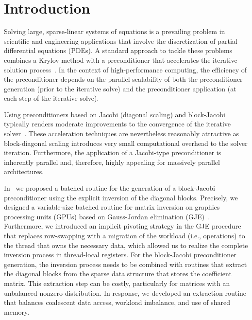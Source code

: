\section{Introduction}
\label{sec:s1-intro}

Solving large, sparse-linear systems of equations is a prevailing problem
in scientific and engineering applications that involve the discretization of
partial differential equations (PDEs). A standard approach to tackle these
problems combines a Krylov method with a preconditioner that accelerates the
iterative solution process~\cite{saad}. In the context of high-performance
computing, the efficiency of the preconditioner depends on the parallel
scalability of both the preconditioner generation (prior to the iterative solve)
and the preconditioner application (at each step of the iterative solve).

Using preconditioners based on Jacobi (diagonal scaling) and block-Jacobi
typically renders moderate improvements to the convergence of the iterative
solver~\cite{saad}. These acceleration techniques are nevertheless reasonably
attractive as block-diagonal scaling introduces very small computational
overhead to the solver iteration.
Furthermore, the application of a Jacobi-type preconditioner is inherently
parallel and, therefore, highly appealing for massively parallel architectures.

In~\cite{Anzt:2017:BGE:3026937.3026940} we proposed a batched routine for the 
generation of a block-Jacobi preconditioner using the explicit inversion of the
diagonal blocks. Precisely, we designed a variable-size batched routine for
matrix inversion on graphics processing units (GPUs) based on Gauss-Jordan
elimination (GJE)~\cite{Householder}. Furthermore, we introduced an implicit
pivoting strategy in the GJE procedure that replaces row-swapping {with a
	migration of the workload (i.e., operations) to the thread that owns the
	necessary data}, which allowed us to realize the complete inversion process in thread-local
registers. For the block-Jacobi preconditioner generation, the inversion process
needs to be combined with routines that extract the diagonal blocks from the
sparse data structure that stores the coefficient matrix. This extraction step
can be costly, particularly for matrices with an unbalanced nonzero
distribution. In response, we developed an extraction routine that balances
coalescent data access, workload imbalance, and use of shared memory.

